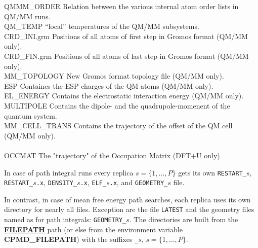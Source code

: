 \documentclass[twoside,10pt,titlepage,a4paper]{article}
\newcommand{\referto}[2]{\hyperlink{#1}{#2}}
\newcommand{\referto}[2]{\htmlref{#2}{#1}}
\newcommand{\refkeyword}[1]{%
\referto{#1}{\textbf{#1}}%
\index{#1}%
}%
\begin{document}
\begin{tabbing}
QMMM\_ORDER  \> Relation between the various internal atom order lists in QM/MM runs.\\
QM\_TEMP     \> ``local'' temperatures of the QM/MM subsystems.\\
CRD\_INI.grm \> Positions of all atoms of first step in Gromos format (QM/MM only).\\
CRD\_FIN.grm \> Positions of all atoms of last step in Gromos format (QM/MM only).\\
MM\_TOPOLOGY \> New Gromos format topology file (QM/MM only).\\
ESP          \> Containes the ESP charges of the QM atoms (QM/MM only).\\
EL\_ENERGY   \> Contains the electrostatic interaction energy (QM/MM only).\\
MULTIPOLE    \> Contains the dipole- and the quadrupole-momenent of the quantum system.\\
MM\_CELL\_TRANS \> Contains the trajectory of the offset of the QM cell (QM/MM only).\\
\\
OCCMAT       \> The "trajectory" of the Occupation Matrix (DFT+U only)\\
\end{tabbing}

In case of path integral runs
every replica $s=\{1, \dots , P\}$ gets its own
\texttt{RESTART\_$s$},
\texttt{RESTART\_$s$.x},
\texttt{DENSITY\_$s$.x},
\texttt{ELF\_$s$.x},
and
\texttt{GEOMETRY\_$s$} file.

\smallskip

In contrast, in case of mean free energy path searches, each replica uses 
its own directory for nearly all files. Exception are the file 
\texttt{LATEST} and the geometry files named as for path integrals: 
\texttt{GEOMETRY\_$s$}. The directories are built from the 
\refkeyword{FILEPATH} path (or else from the environment variable 
{\bf CPMD\_FILEPATH}) with the suffixes \texttt{\_$s$}, $s=\{1, \dots , P\}$.

\medskip
\end{document}
